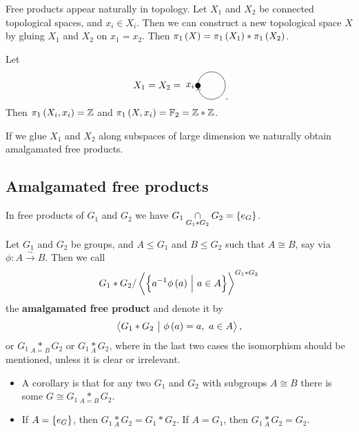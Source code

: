 \begin{remark*}
Free products appear naturally in topology. Let $ X_1 $ and $ X_2 $ be connected topological spaces, and $ x_i \in X_i $. Then we can construct a new topological space $ X $ by gluing $ X_1 $ and $ X_2 $ on $ x_1 = x_2 $. Then $ \pi_1\br{X} = \pi_1\br{X_1} * \pi_1\br{X_2} $.
\end{remark*}

\begin{example*}
Let
$$
\begin{tikzpicture}
\draw (-0.5, 0) node[left]{$ X_1 = X_2 = $};
\fill (0, 0) circle (0.1) node[left]{$ x_i $};
\draw [->] (0, 0) arc (180:-170:0.5);
\end{tikzpicture}.
$$
Then $ \pi_1\br{X_i, x_i} = \ZZ $ and $ \pi_1\br{X, x_i} = \FF_2 = \ZZ * \ZZ $.
\end{example*}

If we glue $ X_1 $ and $ X_2 $ along subspaces of large dimension we naturally obtain amalgamated free products.

\subsection{Amalgamated free products}

In free products of $ G_1 $ and $ G_2 $ we have $ G_1 \underset{G_1 * G_2}{\cap} G_2 = \cbr{e_G} $.

\begin{definition}
Let $ G_1 $ and $ G_2 $ be groups, and $ A \le G_1 $ and $ B \le G_2 $ such that $ A \cong B $, say via $ \phi : A \xrightarrow{\sim} B $. Then we call
$$ G_1 * G_2 / \abr{\cbr{a^{-1}\phi\br{a} \st a \in A}}^{G_1 * G_2} $$
the \textbf{amalgamated free product} and denote it by
$$ \abr{G_1 * G_2 \st \phi\br{a} = a, \ a \in A}, $$
or $ G_1 \underset{A = B}{*} G_2 $ or $ G_1 \underset{A}{*} G_2 $, where in the last two cases the isomorphism should be mentioned, unless it is clear or irrelevant.
\end{definition}

\begin{remark}
\hfill
\begin{itemize}
\item A corollary is that for any two $ G_1 $ and $ G_2 $ with subgroups $ A \cong B $ there is some $ G \cong G_1 \underset{A = B}{*} G_2 $.
\item If $ A = \cbr{e_G} $, then $ G_1 \underset{A}{*} G_2 = G_1 * G_2 $. If $ A = G_1 $, then $ G_1 \underset{A}{*} G_2 = G_2 $.
\end{itemize}
\end{remark}

